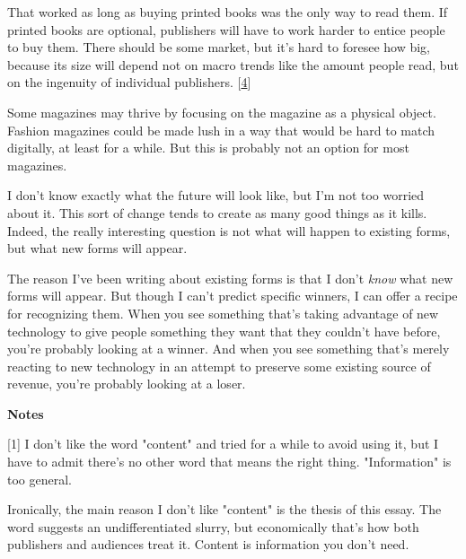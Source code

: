 That worked as long as
                  buying printed books was the only way to read them. If printed
                  books are optional, publishers will have to work harder to
                  entice people to buy them. There should be some market, but
                  it's hard to foresee how big, because its size will depend not
                  on macro trends like the amount people read, but on the
                  ingenuity of individual publishers.
                  [\href{\#f4n}{4}]

Some magazines may thrive by focusing on the
                  magazine as a physical object. Fashion magazines could be made
                  lush in a way that would be hard to match digitally, at least
                  for a while. But this is probably not an option for most
                  magazines.

I don't know exactly what the future
                  will look like, but I'm not too worried about it. This sort of
                  change tends to create as many good things as it kills.
                  Indeed, the really interesting question is not what will
                  happen to existing forms, but what new forms will appear.

The
                  reason I've been writing about existing forms is that I don't
                  \emph{know} what new forms will appear. But though I can't
                  predict specific winners, I can offer a recipe for recognizing
                  them. When you see something that's taking advantage of new
                  technology to give people something they want that they
                  couldn't have before, you're probably looking at a winner. And
                  when you see something that's merely reacting to new
                  technology in an attempt to preserve some existing source of
                  revenue, you're probably looking at a loser.






                  \textbf{Notes}

[1] I don't like the word "content" and tried for a while to
                  avoid using it, but I have to admit there's no other word that
                  means the right thing. "Information" is too general.

Ironically,
                  the main reason I don't like "content" is the thesis of this
                  essay. The word suggests an undifferentiated slurry, but
                  economically that's how both publishers and audiences treat
                  it. Content is information you don't need.


